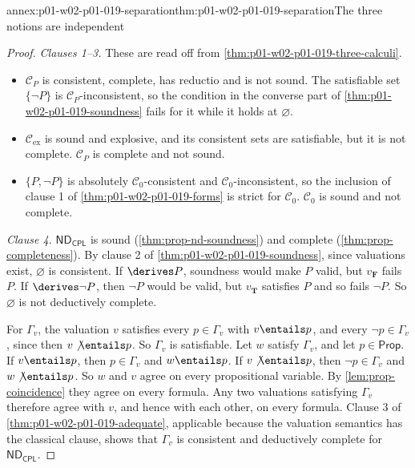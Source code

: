 \begin{annexitem}{annex:p01-w02-p01-019-separation}{thm:p01-w02-p01-019-separation}{The three notions are independent}
\begin{proof}
\emph{Clauses 1--3.} These are read off from
\cref{thm:p01-w02-p01-019-three-calculi}.
\begin{itemize}
  \item \(\mathcal C_P\) is consistent, complete, has reductio and is not
        sound. The satisfiable set \(\{\neg P\}\) is
        \(\mathcal C_P\)-inconsistent, so the condition in the converse part
        of \cref{thm:p01-w02-p01-019-soundness} fails for it while it holds
        at \(\varnothing\).
  \item \(\mathcal C_{\mathrm{ex}}\) is sound and explosive, and its
        consistent sets are satisfiable, but it is not complete.
        \(\mathcal C_P\) is complete and not sound.
  \item \(\{P,\neg P\}\) is absolutely \(\mathcal C_0\)-consistent and
        \(\mathcal C_0\)-inconsistent, so the inclusion of clause 1 of
        \cref{thm:p01-w02-p01-019-forms} is strict for \(\mathcal C_0\).
        \(\mathcal C_0\) is sound and not complete.
\end{itemize}

\emph{Clause 4.} \(\mathsf{ND}_{\mathsf{CPL}}\) is sound
(\cref{thm:prop-nd-soundness}) and complete (\cref{thm:prop-completeness}).
By clause 2 of \cref{thm:p01-w02-p01-019-soundness}, since valuations exist,
\(\varnothing\) is consistent. If \(\derives P\), soundness would make \(P\)
valid, but \(v_{\mathbf F}\) fails \(P\). If \(\derives\neg P\), then
\(\neg P\) would be valid, but \(v_{\mathbf T}\) satisfies \(P\) and so fails
\(\neg P\). So \(\varnothing\) is not deductively complete.

For \(\Gamma_v\), the valuation \(v\) satisfies every \(p\in\Gamma_v\) with
\(v\entails p\), and every \(\neg p\in\Gamma_v\), since then \(v\not\entails p\).
So \(\Gamma_v\) is satisfiable. Let \(w\) satisfy \(\Gamma_v\), and let
\(p\in\mathsf{Prop}\). If \(v\entails p\), then \(p\in\Gamma_v\) and
\(w\entails p\). If \(v\not\entails p\), then \(\neg p\in\Gamma_v\) and
\(w\not\entails p\). So \(w\) and \(v\) agree on every propositional
variable. By \cref{lem:prop-coincidence} they agree on every formula. Any two
valuations satisfying \(\Gamma_v\) therefore agree with \(v\), and hence with
each other, on every formula. Clause 3 of
\cref{thm:p01-w02-p01-019-adequate}, applicable because the valuation
semantics has the classical clause, shows that \(\Gamma_v\) is consistent and
deductively complete for \(\mathsf{ND}_{\mathsf{CPL}}\).
\end{proof}
\end{annexitem}

